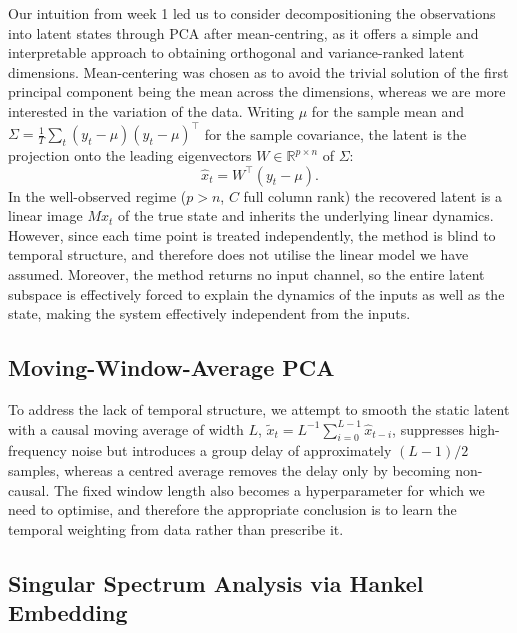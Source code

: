 \documentclass[11pt,a4paper]{article}
\begin{document}
Our intuition from week 1 led us to consider decompositioning the observations into latent states through PCA after mean-centring, as it offers a simple and interpretable approach to obtaining orthogonal and variance-ranked latent dimensions. Mean-centering was chosen as to avoid the trivial solution of the first principal component being the mean across the dimensions, whereas we are more interested in the variation of the data. 
Writing $\mu$ for the sample mean and $\Sigma = \frac{1}{T}\sum_t (y_t - \mu)(y_t - \mu)^\top$ for the sample covariance, the latent is the projection onto the leading eigenvectors $W \in \mathbb{R}^{p \times n}$ of $\Sigma$:
\begin{equation}
\hat{x}_t = W^\top(y_t - \mu).
\end{equation}
In the well-observed regime ($p > n$, $C$ full column rank) the recovered latent is a linear image $Mx_t$ of the true state and inherits the underlying linear dynamics. However, since each time point is treated independently, the method is blind to temporal structure, and therefore does not utilise the linear model we have assumed. Moreover, the method returns no input channel, so the entire latent subspace is effectively forced to explain the dynamics of the inputs as well as the state, making the system effectively independent from the inputs.

\subsection{Moving-Window-Average PCA}

To address the lack of temporal structure, we attempt to smooth the static latent with a causal moving average of width $L$, $\tilde{x}_t = L^{-1}\sum_{i=0}^{L-1}\hat{x}_{t-i}$, suppresses high-frequency noise but introduces a group delay of approximately $(L-1)/2$ samples, whereas a centred average removes the delay only by becoming non-causal. The fixed window length also becomes a hyperparameter for which we need to optimise, and therefore the appropriate conclusion is to learn the temporal weighting from data rather than prescribe it.

\subsection{Singular Spectrum Analysis via Hankel Embedding}
\end{document}
